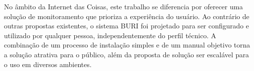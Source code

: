 No âmbito da Internet das Coisas, este trabalho se diferencia por oferecer uma solução de monitoramento que prioriza a experiência do usuário. Ao contrário de outras propostas existentes, o sistema BURI foi projetado para ser 
configurado e utilizado por qualquer pessoa, independentemente do perfil técnico. A combinação de um processo de instalação simples e de um manual objetivo torna a solução atrativa para o público, além da proposta de solução 
ser escalável para o uso em diversos ambientes. 